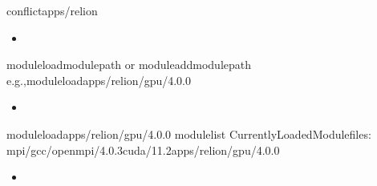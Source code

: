 \documentclass[a4paper,10pt,english]{sphinxmanual}
\begin{document}
\begin{sphinxVerbatim}[commandchars=\\\{\}]
conflictapps/relion
\PYGZhy{}\PYGZhy{}\PYGZhy{}\PYGZhy{}\PYGZhy{}\PYGZhy{}\PYGZhy{}\PYGZhy{}\PYGZhy{}\PYGZhy{}\PYGZhy{}\PYGZhy{}\PYGZhy{}\PYGZhy{}\PYGZhy{}\PYGZhy{}\PYGZhy{}\PYGZhy{}\PYGZhy{}\PYGZhy{}\PYGZhy{}\PYGZhy{}\PYGZhy{}\PYGZhy{}\PYGZhy{}\PYGZhy{}\PYGZhy{}\PYGZhy{}\PYGZhy{}\PYGZhy{}\PYGZhy{}\PYGZhy{}\PYGZhy{}\PYGZhy{}\PYGZhy{}\PYGZhy{}\PYGZhy{}\PYGZhy{}\PYGZhy{}\PYGZhy{}\PYGZhy{}\PYGZhy{}\PYGZhy{}\PYGZhy{}\PYGZhy{}\PYGZhy{}\PYGZhy{}\PYGZhy{}\PYGZhy{}\PYGZhy{}\PYGZhy{}\PYGZhy{}\PYGZhy{}\PYGZhy{}\PYGZhy{}\PYGZhy{}\PYGZhy{}\PYGZhy{}\PYGZhy{}\PYGZhy{}\PYGZhy{}\PYGZhy{}\PYGZhy{}\PYGZhy{}\PYGZhy{}\PYGZhy{}\PYGZhy{}
\end{sphinxVerbatim}
\begin{itemize}
\item {} 
\sphinxAtStartPar
{}

\end{itemize}

\begin{sphinxVerbatim}[commandchars=\\\{\}]
\PYGZdl{}\PYGZgt{}moduleload\PYGZlt{}module\PYGZus{}path\PYGZgt{}
or
\PYGZdl{}\PYGZgt{}moduleadd\PYGZlt{}module\PYGZus{}path\PYGZgt{}
e.g.,\PYGZdl{}\PYGZgt{}moduleloadapps/relion/gpu/4.0.0
\end{sphinxVerbatim}
\begin{itemize}
\item {} 
\sphinxAtStartPar
{}

\end{itemize}

\begin{sphinxVerbatim}[commandchars=\\\{\}]
\PYGZdl{}\PYGZgt{}moduleloadapps/relion/gpu/4.0.0
\PYGZdl{}\PYGZgt{}modulelist
CurrentlyLoadedModulefiles:
mpi/gcc/openmpi/4.0.3cuda/11.2apps/relion/gpu/4.0.0
\end{sphinxVerbatim}
\begin{itemize}
\item {} 
\sphinxAtStartPar
{}

\end{itemize}
\end{document}
